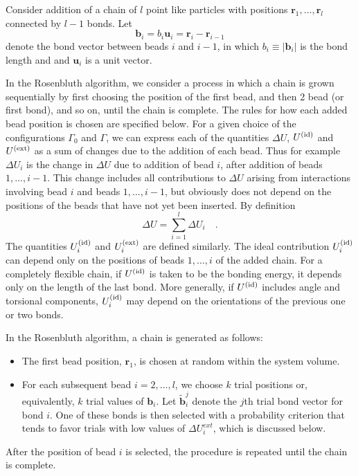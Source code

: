 \documentclass[12pt]{article} %
\newcommand{\vv}[1]{\mathbf{#1}}
\newcommand\system{\Gamma_{0}}
\newcommand\chain{\Gamma}
\newcommand\delU{\Delta U}
\newcommand\Uid{U^{({\rm id})}}
\newcommand\Uext{U^{({\rm ext})}}
\newcommand\vbead{\vv{r}}
\newcommand\qbead{\vv{r}_{1}}
\newcommand\nbead{l}
\newcommand\vbond{\vv{b}}
\newcommand\ubond{\vv{u}}
\newcommand\rbond{b}
\newcommand\nbond{l-1}
\newcommand\ntrial{k}
\newcommand\vtrial{\tilde{\vv{b}}}
\begin{document}
Consider addition of a chain of $\nbead$ point like particles with positions 
$\vbead_{1},\ldots,\vbead_{\nbead}$ connected by $\nbond$ bonds. Let 
\begin{equation}
   \vbond_{i} = \rbond_{i} \ubond_{i} = \vbead_{i} - \vbead_{i-1}
\end{equation}
denote the bond vector between beads $i$ and $i-1$, in which $\rbond_{i} \equiv |\vbond_{i}|$
is the bond length and and $\ubond_{i}$ is a unit vector.  

In the Rosenbluth algorithm, we consider a process in which a chain is grown sequentially 
by first choosing the position of the first bead, and then 2 bead (or first bond), and so 
on, until the chain is complete. The rules for how each added bead position is chosen are 
specified below. For a given choice of the configurations $\system$ and $\chain$, we can
express each of the quantities $\delU$, $\Uid$ and $\Uext$ as a sum of changes due to
the addition of each bead. Thus for example $\delU_{i}$ is the change in $\delU$ due to
addition of bead $i$, after addition of beads $1, \ldots, i-1$. This change includes all
contributions to $\delU$ arising from interactions involving bead $i$ and beads $1,\ldots,
i-1$, but obviously does not depend on the positions of the beads that have not yet been 
inserted. By definition
\begin{equation}
   \delU = \sum_{i=1}^{\nbead} \delU_{i} \quad.
\end{equation}
The quantities $\Uid_{i}$ and $\Uext_{i}$ are defined similarly. 
The ideal contribution $\Uid_{i}$ can depend only on the positions of beads $1,\ldots,i$
of the added chain. For a completely flexible chain, if $\Uid$ is taken to be the bonding
energy, it depends only on the length of the last bond. More generally, if $\Uid$ includes
angle and torsional components, $\Uid_{i}$ may depend on the orientations of the previous
one or two bonds. 

In the Rosenbluth algorithm, a chain is generated as follows:
\begin{itemize}
\item The first bead position, $\qbead$, is chosen at random within the system volume.
\item For each subsequent bead $i=2,\ldots, \nbead$, we choose $\ntrial$ trial positions 
or, equivalently, $\ntrial$ trial values of $\vbond_{i}$. Let $\vtrial_{i}^{j}$ denote 
the $j$th trial bond vector for bond $i$. One of these bonds is then selected with a 
probability criterion that tends to favor trials with low values of $\delU^{ext}_{i}$, which
is discussed below. 
\end{itemize}
After the position of bead $i$ is selected, the procedure is repeated until the chain
is complete. 
\end{document}
